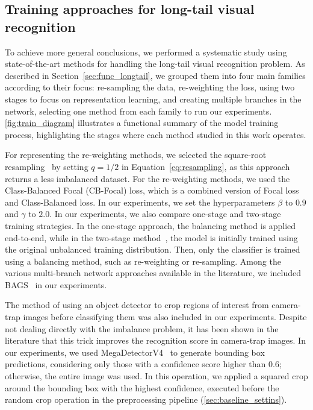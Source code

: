 \subsection{Training approaches for long-tail visual recognition}

To achieve more general conclusions, we performed a systematic study using
state-of-the-art methods for handling the long-tail visual recognition problem.
As described in Section~\ref{sec:func_longtail}, we grouped them into four main
families according to their focus: re-sampling the data, re-weighting the loss,
using two stages to focus on representation learning, and creating multiple
branches in the network, selecting one method from each family to run our
experiments. \autoref{fig:train_diagram} illustrates a functional summary of
the model training process, highlighting the stages where each method studied in
this work operates.

For representing the re-weighting methods, we selected the square-root
resampling~\cite{Kang2020Decoupling, zhang2021bag} by setting $q=1/2$ in
Equation~\ref{eq:resampling}, as this approach returns a less imbalanced
dataset. For the re-weighting methods, we used the Class-Balanced Focal
(CB-Focal) loss, which is a combined version of Focal loss and Class-Balanced
loss. In our experiments, we set the hyperparameters $\beta$ to $0.9$ and
$\gamma$ to $2.0$. In our experiments, we also compare one-stage and two-stage
training strategies. In the one-stage approach, the balancing method is applied
end-to-end, while in the two-stage method~\cite{Kang2020Decoupling}, the model
is initially trained using the original unbalanced training distribution. Then,
only the classifier is trained using a balancing method, such as re-weighting or
re-sampling. Among the various multi-branch network approaches available in the
literature, we included BAGS~\cite{li2020overcoming} in our experiments.

The method of using an object detector to crop regions of interest from
camera-trap images before classifying them was also included in our experiments.
Despite not dealing directly with the imbalance problem, it has been shown in
the literature \citep{schneider2018deep, beery2019efficient} that this trick
improves the recognition score in camera-trap images. In our experiments, we
used MegaDetectorV4~\citep{beery2019efficient} to generate bounding box
predictions, considering only those with a confidence score higher than $0.6$;
otherwise, the entire image was used. In this operation, we applied a squared
crop around the bounding box with the highest confidence, executed before the
random crop operation in the preprocessing pipeline
(\autoref{sec:baseline_settins}).

